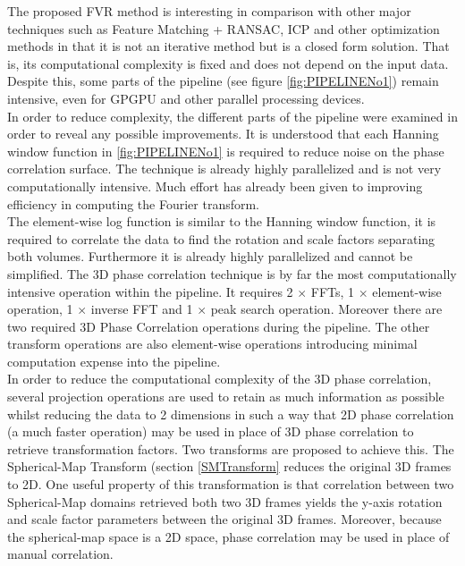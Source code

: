
The proposed FVR method is interesting in comparison with other major techniques such as Feature Matching + RANSAC, ICP and other optimization methods in that it is not an iterative method but is a closed form solution. That is, its computational complexity is fixed and does not depend on the input data. Despite this, some parts of the pipeline (see figure \ref{fig:PIPELINENo1}) remain intensive, even for GPGPU and other parallel processing devices. \\

In order to reduce complexity, the different parts of the pipeline were examined in order to reveal any possible improvements. It is understood that each Hanning window function in \ref{fig:PIPELINENo1} is required to reduce noise on the phase correlation surface. The technique is already highly parallelized    and is not very computationally intensive. Much effort has already been given to improving efficiency in computing the Fourier transform. \\

The element-wise log function is similar to the Hanning window function, it is required to correlate the data to find the rotation and scale factors separating both volumes. Furthermore it is already highly parallelized and cannot be simplified. The 3D phase correlation technique is by far the most computationally intensive operation within the pipeline. It requires 2 $\times$ FFTs, 1 $\times$ element-wise operation, 1 $\times$ inverse FFT and 1 $\times$ peak search operation. Moreover there are two required 3D Phase Correlation operations during the pipeline. The other transform operations are also element-wise operations introducing minimal computation expense into the pipeline. \\

In order to reduce the computational complexity of the 3D phase correlation, several projection operations are used to retain as much information as possible whilst reducing the data to 2 dimensions in such a way that 2D phase correlation (a much faster operation) may be used in place of 3D phase correlation to retrieve transformation factors. Two transforms are proposed to achieve this. The Spherical-Map Transform (section \ref{SMTransform} reduces the original 3D frames to 2D. One useful property of this transformation is that correlation between two Spherical-Map domains retrieved both two 3D frames yields the y-axis rotation and scale factor parameters between the original 3D frames. Moreover, because the spherical-map space is a 2D space, phase correlation may be used in place of manual correlation.  \\

